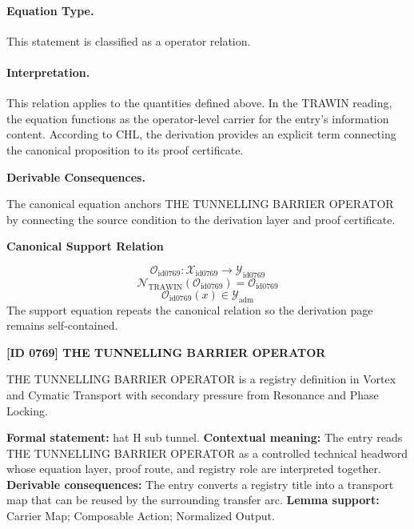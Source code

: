 \paragraph{Equation Type.}
This statement is classified as a operator relation.

\paragraph{Interpretation.}
This relation applies to the quantities defined above. In the TRAWIN reading, the equation functions as the operator-level carrier for the entry’s information content. According to CHL, the derivation provides an explicit term connecting the canonical proposition to its proof certificate.

\par\vspace{0.35em}
\noindent\textbf{Derivable Consequences.}\quad
\begingroup
\footnotesize
\raggedright
The canonical equation anchors THE TUNNELLING BARRIER OPERATOR by connecting the source condition to the derivation layer and proof certificate.
\par\endgroup

\noindent\textbf{Canonical Support Relation}\par
\[
\mathcal{O}_{\mathrm{id0769}}:\mathcal{X}_{\mathrm{id0769}}\longrightarrow\mathcal{Y}_{\mathrm{id0769}}
\]
\[
\mathcal{N}_{\mathrm{TRAWIN}}(\mathcal{O}_{\mathrm{id0769}})=\mathcal{O}_{\mathrm{id0769}}
\]
\[
\mathcal{O}_{\mathrm{id0769}}(x)\in\mathcal{Y}_{\mathrm{adm}}
\]
\noindent The support equation repeats the canonical relation so the derivation page remains self-contained.\par

\clearpage
\noindent\textbf{[ID 0769] THE TUNNELLING BARRIER OPERATOR}\par
\vspace{0.35em}
\begingroup\small
{}
THE TUNNELLING BARRIER OPERATOR is a registry definition in Vortex and Cymatic Transport with secondary pressure from Resonance and Phase Locking.

\begingroup\footnotesize\setlength{\emergencystretch}{3em}\sloppy
\textbf{Formal statement:} hat H sub tunnel. \textbf{Contextual meaning:} The entry reads THE TUNNELLING BARRIER OPERATOR as a controlled technical headword whose equation layer, proof route, and registry role are interpreted together. \textbf{Derivable consequences:} The entry converts a registry title into a transport map that can be reused by the surrounding transfer arc. \textbf{Lemma support:} Carrier Map; Composable Action; Normalized Output.\par
\endgroup

